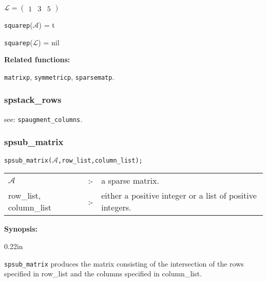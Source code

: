 \begin{flushleft}
\hspace*{0.175in}
\begin{math}  
\mathcal{L} = \left( \begin{array}{ccc} 1 & 3 & 5 
\end{array} \right)
\end{math}  
\end{flushleft}

\vspace*{0.1in}

\hspace*{0.175in} \texttt{squarep}($\mathcal{A}$) = t 

\hspace*{0.175in} \texttt{squarep}($\mathcal{L}$) = nil

\textbf{Related functions:}

\hspace*{0.175in} \texttt{matrixp}, \texttt{symmetricp}, \texttt{sparsematp}.


\subsubsection{spstack\_rows}

\hspace*{0.175in} see: \texttt{spaugment\_columns}.


\subsubsection{spsub\_matrix}

\hspace*{0.175in} \texttt{spsub\_matrix($\mathcal{A}$,row\_list,column\_list);}

\hspace*{0.1in}  
\begin{tabular}{l l l} 
$\mathcal{A}$              &:-& a sparse matrix. \\
row\_list, column\_list &:-& \parbox[t]{.605\linewidth}{either a 
positive integer or a list of positive integers.}
\end{tabular}

\textbf{Synopsis:} 


\begin{addtolength}{\leftskip}{0.22in}

\texttt{spsub\_matrix} produces the matrix consisting of the
              intersection of the rows specified in row\_list and the 
columns specified in column\_list. 

\end{addtolength}

